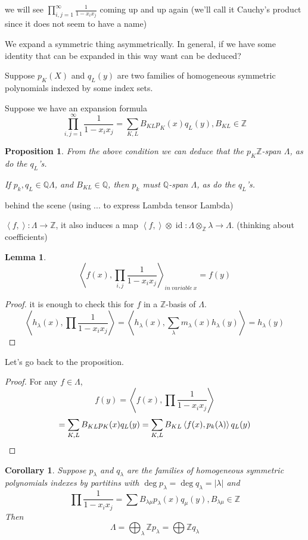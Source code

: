 \documentclass{report}
\newcommand{\Z}{\mathbb{Z}}
\newcommand{\Q}{\mathbb{Q}}
\def \id {\operatorname{id}}
\newcommand{\inner}[2]{\left\langle #1, #2\right\rangle}
\newtheorem{corollary}{Corollary}[section]
\newtheorem{lemma}{Lemma}[section]
\newtheorem{proposition}{Proposition}[section]
\theoremstyle{definition}
\theoremstyle{remark}
\numberwithin{equation}{section}
\begin{document}
we will see $\prod_{i,j = 1}^\infty \frac{1}{1 - x_ix_j}$ coming up and up again (we'll call it Cauchy's product since it does not seem to have a name)

We expand a symmetric thing asymmetrically. In general, if we have some identity that can be expanded in this way want can be deduced?

Suppose $p_K(X)$ and $q_L(y)$ are two families of homogeneous symmetric polynomials indexed by some index sets.

Suppose we have an expansion formula \[
    \prod_{i,j = 1}^\infty \frac{1}{1 - x_ix_j} = \sum_{K, L}B_{KL}p_K(x)q_L(y), B_{KL} \in \Z 
\]

\begin{proposition}
    From the above condition we can deduce that the $p_K \Z$-span $\Lambda$, as do the $q_L$'s.

    If $p_k, q_L \in \Q\Lambda$, and $B_{KL} \in \Q$, then $p_k$ must $\Q$-span $\Lambda$, as do the $q_L$'s.
\end{proposition}

behind the scene (using ... to express Lambda tensor Lambda)

$\inner{f}{}: \Lambda \to \Z$, it also induces a map $\inner{f}{} \otimes \id: \Lambda \otimes_\Z \lambda \to \Lambda$. (thinking about coefficients)
\begin{lemma}
    \[
        \inner{f(x)}{\prod_{i, j} \frac{1}{1-x_ix_j}}_{in\ variable\ x} = f(y)    
    \]
\end{lemma}
\begin{proof}
    it is enough to check this for $f$ in a $\Z$-basis of $\Lambda$. \[
        \inner{h_\lambda(x)}{\prod \frac{1}{1 - x_ix_j}} = \inner{h_\lambda(x)}{\sum_\lambda m_\lambda(x) h_\lambda(y)} = h_\lambda(y)
    \]
\end{proof}

Let's go back to the proposition.
\begin{proof}
    For any $f \in \Lambda$, \[
        f(y) = \inner{f(x)}{\prod \frac{1}{1 - x_ix_j}}     
    \]
    \[
        = \sum_{K, L}B_{KL}p_K(x)q_L(y) = \sum_{K, L} B_{KL}\inner{f(x)}{p_k(\lambda)}q_L(y)    \qedhere
    \]
\end{proof}
\begin{corollary}
    Suppose $p_\lambda$ and $q_\lambda$ are the families of homogeneous symmetric polynomials indexes by partitins with $\deg p_\lambda = \deg q_\lambda = |\lambda|$ and \[
        \prod \frac{1}{1 - x_ix_j} = \sum B_{\lambda\mu}p_\lambda(x)q_\mu(y), B_{\lambda\mu} \in \Z
    \] Then \[
        \Lambda = \bigoplus_\lambda \Z p_\lambda = \bigoplus \Z q_\lambda   
    \]
\end{corollary}
\end{document}
